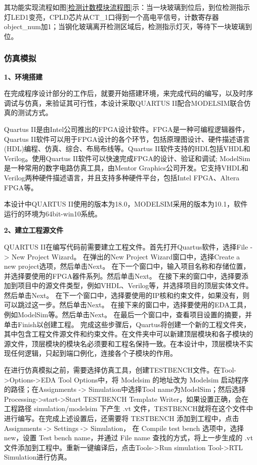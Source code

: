     其功能实现流程如图\ref{检测计数模块流程图}示：当一块玻璃到位后，到位检测指示灯LED1变亮，CPLD芯片从CT\_1口得到一个高电平信号，计数寄存器object\_num加1；当钢化玻璃离开检测区域后，检测指示灯灭，等待下一块玻璃到位。\par
   
    
    \subsubsection{仿真模拟}
    \noindent
    \textbf{1、环境搭建}\par
    在完成程序设计部分的工作后，就要开始搭建环境，来完成代码的编写，以及时序调试与仿真，来验证其可行性，本设计采取QUARTUS II配合MODELSIM联合仿真的测试方式。\par
    Quartus II是由Intel公司推出的FPGA设计软件。FPGA是一种可编程逻辑器件，Quartus II软件可以用于FPGA设计的各个环节，包括原理图设计、硬件描述语言(HDL)编程、仿真、综合、布局布线等。Quartus II软件支持的HDL包括VHDL和Verilog。使用Quartus II软件可以快速完成FPGA的设计、验证和调试;
    ModelSim是一种常用的数字电路仿真工具，由Mentor Graphics公司开发。它支持VHDL和Verilog两种硬件描述语言，并且支持多种硬件平台，包括Intel FPGA、Altera FPGA等。\par
    本设计中QUARTUS II使用的版本为18.0，MODELSIM采用的版本为10.1，软件运行的环境为64bit-win10系统。\par
    \noindent
    \textbf{2、建立工程源文件}\par
    QUARTUS II在编写代码前需要建立工程文件。首先打开Quartus软件，选择File -> New Project Wizard。
    在弹出的New Project Wizard窗口中，选择Create a new project选项，然后单击Next。
    在下一个窗口中，输入项目名称和存储位置，并选择要使用的FPGA器件系列。然后单击Next。
    在接下来的窗口中，选择要添加到项目中的源文件类型，例如VHDL、Verilog等，并选择项目的顶层实体文件。然后单击Next。
    在下一个窗口中，选择要使用的IP核和约束文件，如果没有，则可以跳过这一步。然后单击Next。
    在接下来的窗口中，选择要使用的EDA工具，例如ModelSim等。然后单击Next。
    在最后一个窗口中，查看项目设置的摘要，并单击Finish以创建工程。
    完成这些步骤后，Quartus将创建一个新的工程文件夹，其中包含工程文件源文件和约束文件。在文件夹中可以新建顶层模块和各子模块的源文件，顶层模块的模块名必须要和工程名保持一致。在本设计中，顶层模块不实现任何逻辑，只起到端口例化，连接各个子模块的作用。\par
    在进行仿真模拟之前，需要选择仿真工具，创建TESTBENCH文件。在Tool->Options->EDA Tool Options中，将 Modelsim 的地址改为 Modelsim 启动程序的路径；在Assignments -> Simulation中选择Tool name为ModelSim；然后选择Processing->start->Start TESTBENCH Template Writer，如果设置正确，会在工程路径 simulation/modelsim 下产生 .vt 文件，TESTBENCH就将在这个文件中进行编写。在完成上述设置后，还需要将 TESTBENCH 添加到工程中，点击Assignments -> Settings -> Simulation，
    在 Compile test bench 选项中，选择 new，设置 Test bench name，并通过 File name 查找的方式，将上一步生成的 .vt 文件添加到工程中。重新一键编译后，点击Tools->Run simulation Tool->RTL Simulation进行仿真。
    
